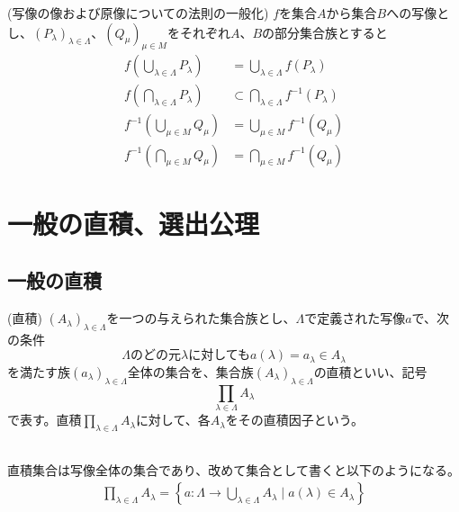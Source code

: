 \documentclass[a4j]{jsarticle}
\begin{document}
\begin{itembox}[l]{ (写像の像および原像についての法則の一般化)}
	$f$を集合$A$から集合$B$への写像とし、$(P_\lambda)_{\lambda \in \Lambda}$、$(Q_\mu)_{\mu \in M}$をそれぞれ$A$、$B$の部分集合族とすると
	\begin{align}
		f \left( \bigcup_{\lambda \in \Lambda}P_\lambda \right) & = \bigcup_{\lambda \in \Lambda}f(P_\lambda)            \\
		f \left( \bigcap_{\lambda \in \Lambda}P_\lambda \right) & \subset \bigcap_{\lambda \in \Lambda}f^{-1}(P_\lambda) \\
		f^{-1} \left( \bigcup_{\mu \in M}Q_\mu \right)          & = \bigcup_{\mu \in M}f^{-1}(Q_\mu)                     \\
		f^{-1} \left( \bigcap_{\mu \in M}Q_\mu \right)          & = \bigcap_{\mu \in M}f^{-1}(Q_\mu)
	\end{align}
\end{itembox}

\section{一般の直積、選出公理}

\subsection{一般の直積}

\begin{itembox}[l]{ (直積)}
	$(A_\lambda)_{\lambda \in \Lambda}$を一つの与えられた集合族とし、$\Lambda$で定義された写像$a$で、次の条件$$ \Lambda\mbox{のどの元}\lambda\mbox{に対しても}a(\lambda)=a_\lambda \in A_\lambda $$を満たす族$(a_\lambda)_{\lambda \in \Lambda}$全体の集合を、集合族$(A_\lambda)_{\lambda \in \Lambda}$の直積といい、記号$$\prod_{\lambda \in \Lambda}A_\lambda$$で表す。直積$\prod_{\lambda \in \Lambda}A_\lambda$に対して、各$A_\lambda$をその直積因子という。
\end{itembox}\\

 直積集合は写像全体の集合であり、改めて集合として書くと以下のようになる。
\begin{align}
	\prod_{\lambda \in \Lambda}A_\lambda = \left\{ a: \Lambda \rightarrow \bigcup_{\lambda \in \Lambda}A_\lambda \mid a(\lambda) \in A_\lambda \right\}
\end{align}
\end{document}
